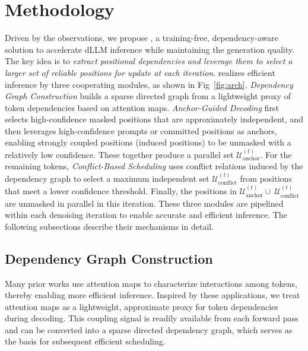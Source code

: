 \section{Methodology}

Driven by the observations, we propose \dawn{}, a training-free, dependency-aware solution to accelerate dLLM inference while maintaining the generation quality.  
The key idea is to \textit{extract positional dependencies and leverage them to select a larger set of reliable positions for update at each iteration}.
\dawn{} realizes efficient inference by three cooperating modules, as shown in Fig~\ref{fig:arch}.
\textit{Dependency Graph Construction} builds a sparse directed graph from a lightweight proxy of token dependencies based on attention maps. \textit{Anchor-Guided Decoding} first selects high-confidence masked positions that are approximately independent, and then leverages high-confidence prompts or committed positions as anchors, enabling strongly coupled positions (induced positions) to be unmasked with a relatively low confidence. These together produce a parallel set $\mathcal{U}^{(t)}_{\text{anchor}}$. For the remaining tokens, \textit{Conflict-Based Scheduling} uses conflict relations induced by the dependency graph to select a maximum independent set $\mathcal{U}^{(t)}_{\text{conflict}}$ from positions that meet a lower confidence threshold. Finally, the positions in  $\mathcal{U}^{(t)}_{\text{anchor}}\cup~\mathcal{U}^{(t)}_{\text{conflict}}$ are unmasked in parallel in this iteration. These three modules are pipelined within each denoising iteration to enable accurate and efficient inference. The following subsections describe their mechanisms in detail.

\subsection{Dependency Graph Construction}
Many prior works \cite{fastv, spargeattn, sageattention, svg} use attention maps to characterize interactions among tokens, thereby enabling more efficient inference. Inspired by these applications, we treat attention maps as a lightweight, approximate proxy for token dependencies during decoding. This coupling signal is readily available from each forward pass and can be converted into a sparse directed dependency graph, which serves as the basis for subsequent efficient scheduling.

